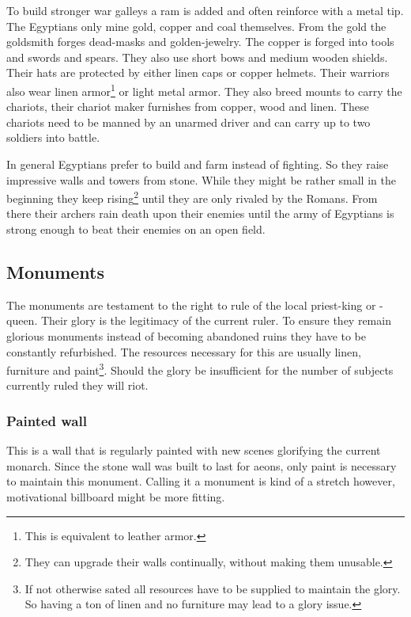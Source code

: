 \documentclass[a4paper]{book}
\begin{document}
	To build stronger war galleys a ram is added and often reinforce with a metal tip.
	The \gls{Egyptians} only mine gold, copper and coal themselves.
	From the gold the goldsmith forges dead-masks and golden-jewelry.
	The copper is forged into tools and swords and spears.
	They also use short bows and medium wooden shields.
	Their hats are protected by either linen caps or copper helmets.
	Their warriors also wear linen armor\footnote{
		This is equivalent to leather armor.
	} or light metal armor.
	They also breed mounts to carry the chariots, their chariot maker
	furnishes from copper, wood and linen.
	These chariots need to be manned by an unarmed driver and can carry up to two soldiers into battle.

	In general \gls{Egyptians} prefer to build and farm instead of fighting.
	So they raise impressive walls and towers from stone.
	While they might be rather small in the beginning they keep rising\footnote{
		They can upgrade their walls continually, without making them unusable.
	}
	until they are only rivaled by the \gls{Romans}.
	From there their archers rain death upon their enemies
	until the army of \gls{Egyptians} is strong enough to beat their enemies on 
	an open field.

	\subsection{Monuments}
		The monuments are testament to the right to rule of the local priest-king or -queen.
		Their glory is the legitimacy of the current ruler.
		To ensure they remain glorious monuments instead of becoming abandoned ruins
		they have to be constantly refurbished.
		The resources necessary for this are usually linen, furniture and paint\footnote{
			If not otherwise sated all resources have to be supplied to maintain the glory.
			So having a ton of linen and no furniture may lead to a glory issue.
		}.
		Should the glory be insufficient for the number of subjects currently ruled
		they will riot.

		\subsubsection{Painted wall}
			This is a wall that is regularly painted with new scenes glorifying the current monarch.
			Since the stone wall was built to last for aeons,
			only paint is necessary to maintain this monument.
			Calling it a monument is kind of a stretch however,
			motivational billboard might be more fitting.
\end{document}
